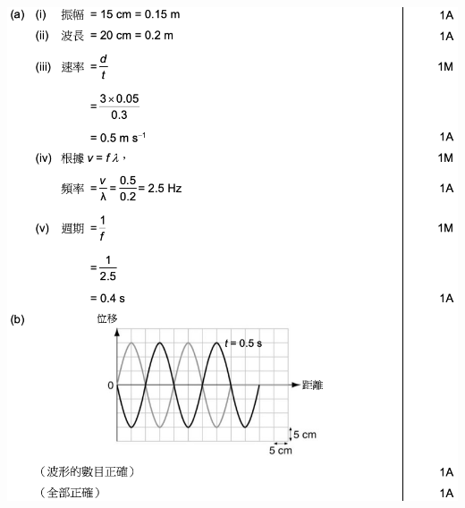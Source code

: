 {
}{
    \sol\par{\par\centering\includegraphics[width=\textwidth]{./img/ch1_earlyclass_wave_lq_2024-05-13-13-22-35.png}\par}
}

